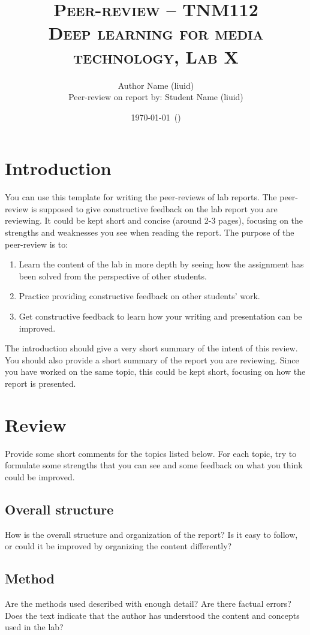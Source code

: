 \documentclass[a4paper]{article}
\title{
	\baselineskip 12pt
	\textsc{
		Peer-review -- TNM112\\
		\small{Deep learning for media technology, Lab X}
	}
}
\author{Author Name (liuid)\\
\small{Peer-review on report by: Student Name (liuid)}}
\date{\small\today\ (\currenttime)}
\begin{document}
\maketitle

\section{Introduction}
You can use this template for writing the peer-reviews of lab reports. The peer-review is supposed to give constructive feedback on the lab report you are reviewing. It could be kept short and concise (around 2-3 pages), focusing on the strengths and weaknesses you see when reading the report. The purpose of the peer-review is to:
\begin{enumerate}
	\item Learn the content of the lab in more depth by seeing how the assignment has been solved from the perspective of other students.
	\item Practice providing constructive feedback on other students' work.
	\item Get constructive feedback to learn how your writing and presentation can be improved.
\end{enumerate}

\noindent The introduction should give a very short summary of the intent of this review. You should also provide a short summary of the report you are reviewing. Since you have worked on the same topic, this could be kept short, focusing on how the report is presented.

\section{Review}
Provide some short comments for the topics listed below. For each topic, try to formulate some strengths that you can see and some feedback on what you think could be improved.

\subsection*{Overall structure}
How is the overall structure and organization of the report? Is it easy to follow, or could it be improved by organizing the content differently?

\subsection*{Method}
Are the methods used described with enough detail? Are there factual errors? Does the text indicate that the author has understood the content and concepts used in the lab?
\end{document}
